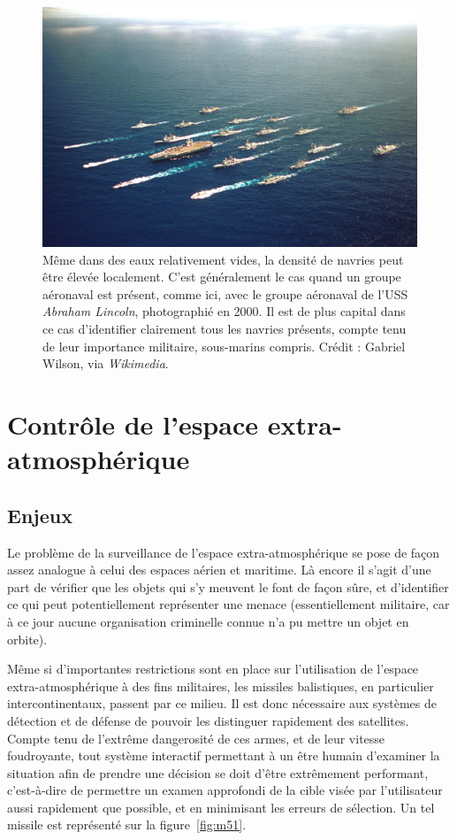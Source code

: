 	\begin{figure}[H]
		\centering
		\includegraphics[width=\textwidth]{figures/ch1/lincoln}
		\caption[Le groupe aéronaval de l'USS \emph{Abraham Lincoln}.]{Même dans des eaux relativement vides, la densité de navries peut être élevée localement. C'est généralement le cas quand un groupe aéronaval est présent, comme ici, avec le groupe aéronaval de l'USS \emph{Abraham Lincoln}, photographié en 2000. Il est de plus capital dans ce cas d'identifier clairement tous les navries présents, compte tenu de leur importance militaire, sous-marins compris. Crédit : Gabriel Wilson, via \emph{Wikimedia}.}
		\label{fig:lincoln}
	\end{figure}
	
	\section{Contrôle de l'espace extra-atmosphérique}
	\subsection{Enjeux}
	Le problème de la surveillance de l'espace extra-atmosphérique se pose de façon assez analogue à celui des espaces aérien et maritime. Là encore il s'agit d'une part de vérifier que les objets qui s'y meuvent le font de façon sûre, et d'identifier ce qui peut potentiellement représenter une menace (essentiellement militaire, car à ce jour aucune organisation criminelle connue n'a pu mettre un objet en orbite).
	
	Même si d'importantes restrictions sont en place sur l'utilisation de l'espace extra-atmosphérique à des fins militaires\footnotemark, les missiles balistiques, en particulier intercontinentaux, passent par ce milieu. Il est donc nécessaire aux systèmes de détection et de défense de pouvoir les distinguer rapidement des satellites. Compte tenu de l'extrême dangerosité de ces armes, et de leur vitesse foudroyante, tout système interactif permettant à un être humain d'examiner la situation afin de prendre une décision se doit d'être extrêmement performant, c'est-à-dire de permettre un examen approfondi de la cible visée par l'utilisateur aussi rapidement que possible, et en minimisant les erreurs de sélection. Un tel missile est représenté sur la figure~\ref{fig:m51}.
	
